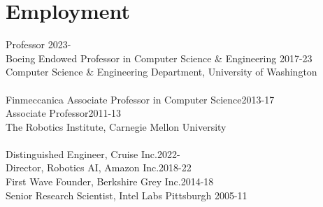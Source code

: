 
\section{Employment}
\noindent
Professor \hfill 2023-\phantom{20}\\
Boeing Endowed Professor in Computer Science \& Engineering \hfill 2017-23\\
Computer Science \& Engineering Department, 
University of Washington\\
\\
Finmeccanica Associate Professor in Computer Science\hfill 2013-17\\
Associate Professor\hfill 2011-13\\
The Robotics Institute,  Carnegie Mellon University\\
\\
Distinguished Engineer, Cruise Inc.\hfill 2022-\phantom{20}\\
Director, Robotics AI, Amazon Inc.\hfill 2018-22\\
First Wave Founder, Berkshire Grey Inc.\hfill 2014-18\\
Senior Research Scientist, Intel Labs Pittsburgh \hfill 2005-11


